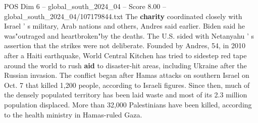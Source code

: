 \begin{textsample}{POS Dim 6 – global\_south\_2024\_04 – Score 8.00 – global\_south\_2024\_04/107179844.txt}
The \textbf{charity} coordinated closely with Israel ' s military, Arab nations and others, Andres said earlier.
Biden said he was"outraged and heartbroken"by the deaths.
The U.S. sided with Netanyahu ' s assertion that the strikes were not deliberate.
Founded by Andres, 54, in 2010 after a Haiti earthquake, World Central Kitchen has tried to sidestep red tape around the world to rush \textbf{aid} to disaster-hit areas, including Ukraine after the Russian invasion.
The conflict began after Hamas attacks on southern Israel on Oct. 7 that killed 1,200 people, according to Israeli figures.
Since then, much of the densely populated territory has been laid waste and most of its 2.3 million population displaced.
More than 32,000 Palestinians have been killed, according to the health ministry in Hamas-ruled Gaza.

\end{textsample}
